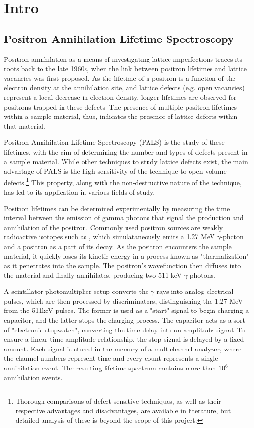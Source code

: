 \chapter{Intro}

\section{Positron Annihilation Lifetime Spectroscopy}

Positron annihilation as a means of investigating lattice imperfections traces its roots back to the late 1960s, when the link between positron lifetimes and lattice vacancies was first proposed. \cite{Mackenzie67} As the lifetime of a positron is a function of the electron density at the annihilation site, and lattice defects (e.g. open vacancies) represent a local decrease in electron density, longer lifetimes are observed for positrons trapped in these defects. \cite{Krause} The presence of multiple positron lifetimes within a sample material, thus, indicates the presence of lattice defects within that material.

Positron Annihilation Lifetime Spectroscopy (PALS) is the study of these lifetimes, with the aim of determining the number and types of defects present in a sample material. While other techniques to study lattice defects exist, the main advantage of PALS is the high sensitivity of the technique to open-volume defects.\footnote{Thorough comparisons of defect sensitive techniques, as well as their respective advantages and disadvantages, are available in literature, but detailed analysis of these is beyond the scope of this project.} This property, along with the non-destructive nature of the technique, has led to its application in various fields of study.\cite{PharmApp} \cite{Nuc}

Positron lifetimes can be determined experimentally by measuring the time interval between the emission of gamma photons that signal the production and annihilation of the positron. Commonly used positron sources are weakly radioactive isotopes such as , which simulataneously emits a 1.27 MeV $\gamma$-photon and a positron as a part of its \ch{$\beta$^{+}} decay. As the positron encounters the sample material, it quickly loses its kinetic energy in a process known as "thermalization" as it penetrates into the sample. The positron's wavefunction then diffuses into the material and finally annihilates, producing two 511 keV $\gamma$-photons.

A scintillator-photomultiplier setup converts the $\gamma$-rays into analog electrical pulses, which are then processed by discriminators, distinguishing the 1.27 MeV from the 511keV pulses. The former is used as a "start" signal to begin charging a capacitor, and the latter stops the charging process. The capacitor acts as a sort of "electronic stopwatch", converting the time delay into an amplitude signal. To ensure a linear time-amplitude relationship, the stop signal is delayed by a fixed amount. Each signal is stored in the memory of a multichannel analyzer, where the channel numbers represent time and every count represents a single annihilation event. The resulting lifetime spectrum contains more than $10^6$ annihilation events.

